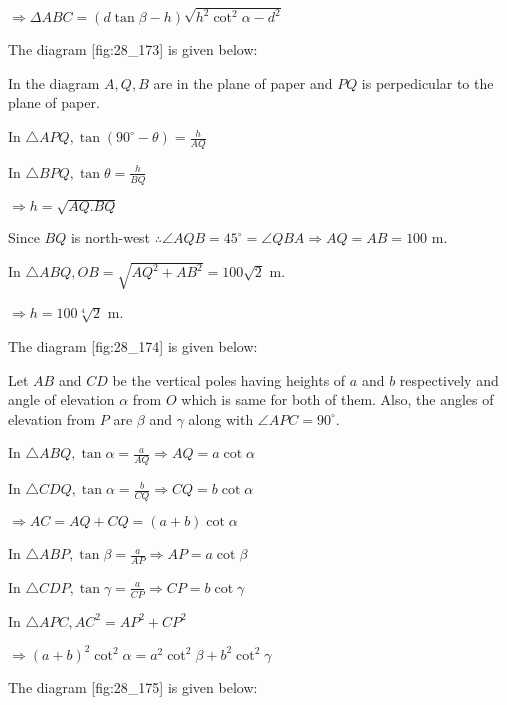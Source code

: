   $\Rightarrow \Delta ABC = (d\tan\beta - h)\sqrt{h^2\cot^2\alpha - d^2}$

\item The diagram [fig:28_173] is given below:

  \startplacefigure[reference=fig:28_173]
    \externalfigure[28_173.pdf]
  \stopplacefigure

  In the diagram $A, Q, B$ are in the plane of paper and $PQ$ is perpedicular to the plane
  of paper.

  In $\triangle APQ, \tan(90^\circ - \theta) = \frac{h}{AQ}$

  In $\triangle BPQ, \tan\theta = \frac{h}{BQ}$

  $\Rightarrow h = \sqrt{AQ.BQ}$

  Since $BQ$ is north-west $\therefore \angle AQB = 45^\circ = \angle QBA\Rightarrow AQ = AB
  = 100$ m.

  In $\triangle ABQ, OB = \sqrt{AQ^2 + AB^2} = 100\sqrt{2}$ m.

  $\Rightarrow h = 100\sqrt[4]{2}$ m.

\item The diagram [fig:28_174] is given below:

  \startplacefigure[reference=fig:28_174]
    \externalfigure[28_174.pdf]
  \stopplacefigure

  Let $AB$ and $CD$ be the vertical poles having heights of $a$ and $b$
  respectively and angle of elevation $\alpha$ from $O$ which is same for both of them. Also,
  the angles of elevation from $P$ are $\beta$ and $\gamma$ along with $\angle
  APC = 90^\circ$.

  In $\triangle ABQ, \tan\alpha = \frac{a}{AQ} \Rightarrow AQ = a\cot\alpha$

  In $\triangle CDQ, \tan\alpha = \frac{b}{CQ} \Rightarrow CQ = b\cot\alpha$

  $\Rightarrow AC = AQ + CQ = (a + b)\cot\alpha$

  In $\triangle ABP, \tan\beta = \frac{a}{AP} \Rightarrow AP = a\cot\beta$

  In $\triangle CDP, \tan\gamma = \frac{a}{CP}\Rightarrow CP = b\cot\gamma$

  In $\triangle APC, AC^2 = AP^2 + CP^2$

  $\Rightarrow (a + b)^2\cot^2\alpha = a^2\cot^2\beta + b^2\cot^2\gamma$

\item The diagram [fig:28_175] is given below:

  \startplacefigure[reference=fig:28_175]
    \externalfigure[28_175.pdf]
  \stopplacefigure

